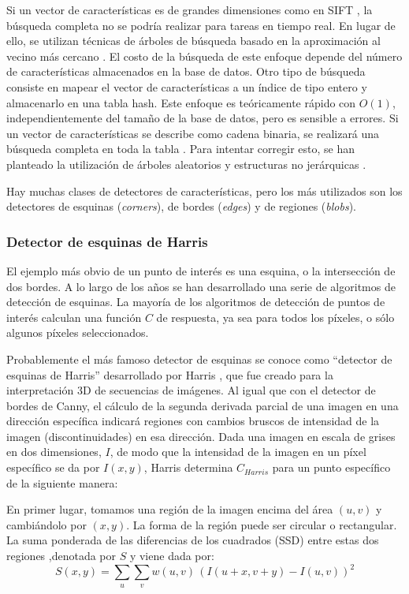 \begin{description}
  Si un vector de características es de grandes dimensiones como en SIFT \cite{Lowe}, la búsqueda completa no se podría realizar para tareas en tiempo real. En lugar de ello,  se utilizan técnicas de árboles de búsqueda basado en la aproximación al vecino más cercano \cite{Arya} \cite{Muja}. El costo de la búsqueda de este enfoque depende del número de características almacenados en la base de datos. Otro tipo de búsqueda consiste en mapear el vector de características a un índice de tipo entero \cite{Datar} y almacenarlo en una tabla hash. Este enfoque es teóricamente rápido con $O(1)$, independientemente del tamaño de la base de datos, pero es sensible a errores. Si un vector de características se describe como cadena binaria, se realizará una búsqueda completa en toda la tabla \cite{Calonder}. Para intentar corregir esto, se han planteado la utilización de árboles aleatorios \cite{Lepetit} y estructuras no jerárquicas \cite{Ozuysal}.
\end{description}

Hay muchas clases de detectores de características, pero los más utilizados son los detectores de esquinas (\emph{corners}), de bordes (\emph{edges}) y de regiones (\emph{blobs}). 

\subsubsection{Detector de esquinas de Harris}
El ejemplo más obvio de un punto de interés es una esquina, o la intersección de dos bordes. A lo largo de los años se han desarrollado una serie de algoritmos de detección de esquinas. La mayoría de los algoritmos de detección de puntos de interés calculan una función $C$ de respuesta, ya sea para todos los píxeles, o sólo algunos píxeles seleccionados. 

Probablemente el más famoso detector de esquinas se conoce como ``detector de esquinas de Harris'' desarrollado por Harris \cite{Harris}, que fue creado para la interpretación 3D de secuencias de imágenes. Al igual que con el detector de bordes de Canny, el cálculo de la segunda derivada parcial de una imagen en una dirección específica indicará regiones con cambios bruscos de intensidad de la imagen (discontinuidades) en esa dirección. Dada una imagen en escala de grises en dos dimensiones, $I$, de modo que la intensidad de la imagen en un píxel específico se da por $I(x,y)$, Harris determina $C_{Harris}$ para un punto específico de la siguiente manera: 

En primer lugar, tomamos una región de la imagen encima del área $(u,v)$ y cambiándolo por $(x,y)$. La forma de la región puede ser circular o rectangular. La suma ponderada de las diferencias de los cuadrados (SSD) entre estas dos regiones ,denotada por $S$ y viene dada por:
\begin{equation}
  S(x,y) = \sum_u \sum_v w(u,v) \, \left( I(u+x,v+y) - I(u,v)\right)^2
\end{equation}

